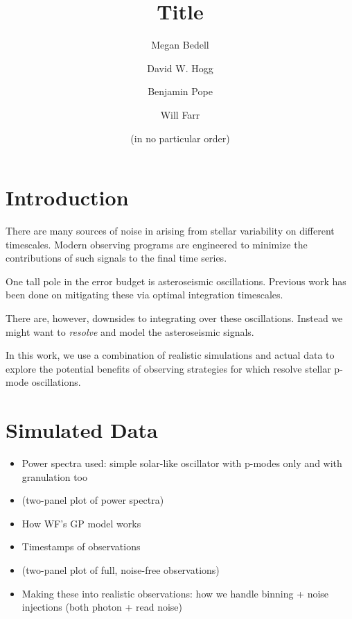 \documentclass[modern]{aastex62}
\begin{document}
\sloppy\sloppypar\raggedbottom\frenchspacing %

\graphicspath{ {figures/} }

\title{Title}

\author[0000-0001-9907-7742]{Megan Bedell}
\affiliation{\flatiron}

\author{David W. Hogg}

\author{Benjamin Pope}

\author{Will Farr}

\author{(in no particular order)}



\begin{abstract}\noindent
{}
\end{abstract}

\section{Introduction}
\label{s:intro}

There are many sources of noise in \EPRV arising from stellar variability on different timescales. 
Modern observing programs are engineered to minimize the contributions of such signals to the final \RV time series.

One tall pole in the \EPRV error budget is asteroseismic oscillations. 
Previous work has been done on mitigating these via optimal integration timescales.

There are, however, downsides to integrating over these oscillations. 
Instead we might want to \textit{resolve} and model the asteroseismic signals.

In this work, we use a combination of realistic simulations and actual \HARPS data to explore the potential benefits of observing strategies for \EPRV which resolve stellar p-mode oscillations. 


\section{Simulated Data}

\begin{itemize}
\item Power spectra used: simple solar-like oscillator with p-modes only and with granulation too
\item (two-panel plot of power spectra)
\item How WF's GP model works
\item Timestamps of observations
\item (two-panel plot of full, noise-free observations)
\item Making these into realistic observations: how we handle binning + noise injections (both photon + read noise)
\end{itemize}
\end{document}
